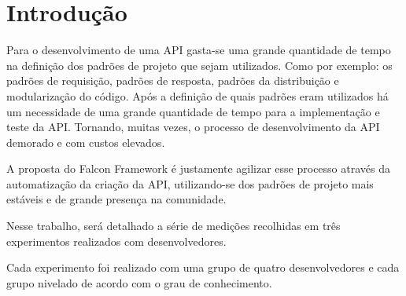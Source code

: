 \chapter[Introdução]{Introdução}\label{cap1}

Para o desenvolvimento de uma API gasta-se uma grande quantidade de tempo na definição dos padrões de projeto que sejam utilizados. Como por exemplo: os padrões de requisição, padrões de resposta, padrões da distribuição e modularização do código. Após a definição de quais padrões eram utilizados há um necessidade de uma grande quantidade de tempo para a implementação e teste da API. Tornando, muitas vezes, o processo de desenvolvimento da API demorado e com custos elevados.\cite{ple}

A proposta do Falcon Framework é justamente agilizar esse processo através da automatização da criação da API, utilizando-se dos padrões de projeto mais estáveis e de grande presença na comunidade.

Nesse trabalho, será detalhado a série de medições recolhidas em três experimentos
realizados com desenvolvedores.

Cada experimento foi realizado com uma grupo de quatro desenvolvedores e cada grupo nivelado
de acordo com o grau de conhecimento.
